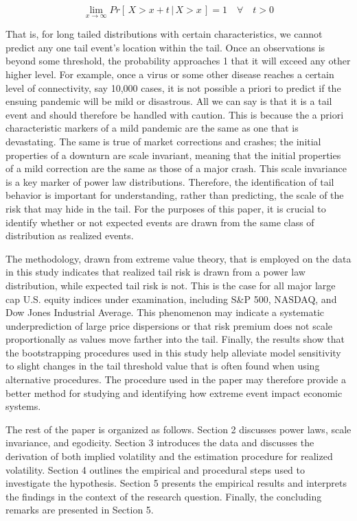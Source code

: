 \documentclass[11pt,a4paper,oldfontcommands]{memoir}
\begin{document}
{\[\lim_{x\to\infty} Pr[\,X > x + t \, \vert \, X > x\,] = 1 \quad  \forall \quad  t > 0\]

That is, for long tailed distributions with certain characteristics, we cannot predict any one tail event's location within the tail. Once an observations is beyond some threshold, the probability approaches 1 that it will exceed any other higher level. For example, once a virus or some other disease reaches a certain level of connectivity, say 10,000 cases, it is not possible a priori to predict if the ensuing pandemic will be mild or disastrous. All we can say is that it is a tail event and should therefore be handled with caution. This is because the a priori characteristic markers of a mild pandemic are the same as one that is devastating. The same is true of market corrections and crashes; the initial properties of a downturn are scale invariant, meaning that the initial properties of a mild correction are the same as those of a major crash. This scale invariance is a key marker of power law distributions. Therefore, the identification of tail behavior is important for understanding, rather than predicting, the scale of the risk that may hide in the tail. For the purposes of this paper, it is crucial to identify whether or not expected events are drawn from the same class of distribution as realized events. 

The methodology, drawn from extreme value theory, that is employed on the data in this study indicates that realized tail risk is drawn from a power law distribution, while expected tail risk is not. This is the case for all major large cap U.S. equity indices under examination, including S&P 500, NASDAQ, and Dow Jones Industrial Average. This phenomenon may indicate a systematic underprediction of large price dispersions or that risk premium does not scale proportionally as values move farther into the tail. Finally, the results show that the bootstrapping procedures used in this study help alleviate model sensitivity to slight changes in the tail threshold value that is often found when using alternative procedures. The procedure used in the paper may therefore provide a better method for studying and identifying how extreme event impact economic systems. 

The rest of the paper is organized as follows. Section 2 discusses power laws, scale invariance, and egodicity. Section 3 introduces the data and discusses the derivation of both implied volatility and the estimation procedure for realized volatility. Section 4 outlines the empirical and procedural steps used to investigate the hypothesis. Section 5 presents the empirical results and interprets the findings in the context of the research question. Finally, the concluding remarks are presented in Section 5.

}
\end{document}
